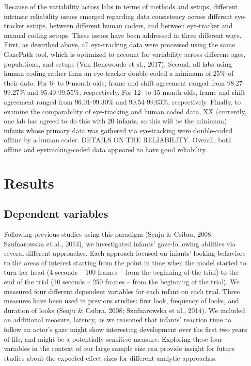 \documentclass[,man,floatsintext]{apa6}
\begin{document}
Because of the variability across labs in terms of methods and setups, different intrinsic reliability issues emerged regarding data consistency across different eye-tracker setups, between different human coders, and between eye-tracker and manual coding setups. These issues have been addressed in three different ways. First, as described above, all eye-tracking data were processed using the same GazePath tool, which is optimized to account for variability across different ages, populations, and setups (Van Renswoude et al., 2017). Second, all labs using human coding rather than an eye-tracker double coded a minimum of 25\% of their data. For 6- to 9-month-olds, frame and shift agreement ranged from 98.27-99.27\% and 95.40-99.55\%, respectively. For 12- to 15-month-olds, frame and shift agreement ranged from 96.01-99.30\% and 90.54-99.63\%, respectively. Finally, to examine the comparability of eye-tracking and human coded data, XX (currently, one lab has agreed to do this with 20 infants, so this will be the minimum) infants whose primary data was gathered via eye-tracking were double-coded offline by a human coder. DETAILS ON THE RELIABILITY. Overall, both offline and eyetracking-coded data appeared to have good reliability.

\hypertarget{results}{%
\section{Results}\label{results}}

\hypertarget{dependent-variables}{%
\subsection{Dependent variables}\label{dependent-variables}}

Following previous studies using this paradigm (Senju \& Csibra, 2008; Szufnarowska et al., 2014), we investigated infants' gaze-following abilities via several different approaches. Each approach focused on infants' looking behaviors to the areas of interest starting from the point in time when the model started to turn her head (4 seconds -- 100 frames -- from the beginning of the trial) to the end of the trial (10 seconds -- 250 frames -- from the beginning of the trial). We measured four different dependent variables for each infant on each trial. Three measures have been used in previous studies: first look, frequency of looks, and duration of looks (Senju \& Csibra, 2008; Szufnarowska et al., 2014). We included an additional measure, latency, as we reasoned that infants' reaction time to follow an actor's gaze might show interesting development over the first two years of life, and might be a potentially sensitive measure. Exploring these four variables in the context of our large sample size can provide insight for future studies about the expected effect sizes for different analytic approaches.
\end{document}
